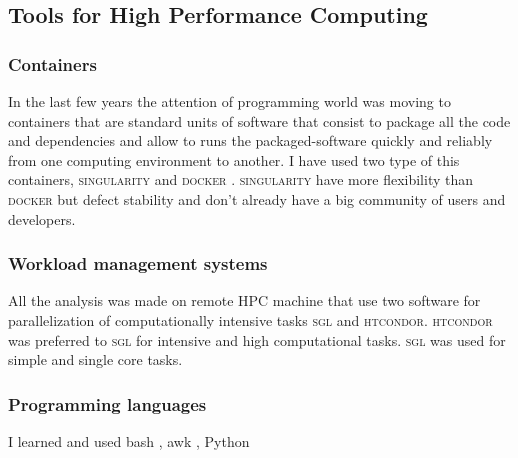 \subsection{Tools for High Performance Computing}

\subsubsection{Containers}
In the last few years the attention of programming world was moving to containers that are standard units of software that consist to package all the \gls{code} and \gls{dependencies} and allow to runs the packaged-software quickly and reliably from one computing environment to another. I have used two type of this containers, \textsc{singularity} \cite{kurtzer2017singularity} and \textsc{docker} \cite{merkel2014docker}. \textsc{singularity} have more flexibility than \textsc{docker} but defect stability and don't already have a big community of users and developers.

\subsubsection{Workload management systems}
All the analysis was made on remote HPC machine that use two software for parallelization of computationally intensive tasks \textsc{sgl} \cite{} and \textsc{htcondor}\cite{condor-practice}. \textsc{htcondor} was preferred to \textsc{sgl} for intensive and high computational tasks. \textsc{sgl} was used for simple and single core tasks.

\subsubsection{Programming languages}
I learned and used bash \cite{gnu2007free}, awk \cite{aho1979awk}, Python \cite{python3} 

